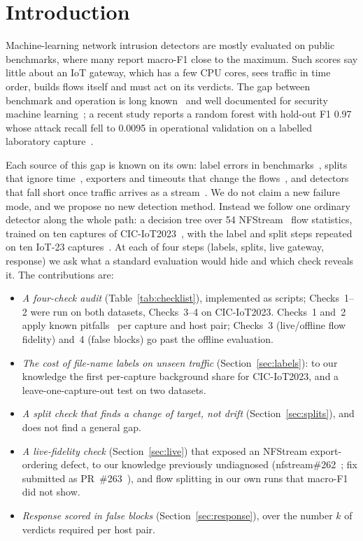 \section{Introduction}\label{sec:intro}

Machine-learning network intrusion detectors are mostly evaluated on public benchmarks, where many report macro-F1 close to the maximum. Such scores say little about an IoT gateway, which has a few CPU cores, sees traffic in time order, builds flows itself and must act on its verdicts. The gap between benchmark and operation is long known~\cite{sommer2010outside} and well documented for security machine learning~\cite{arp2022dos,apruzzese2023sok}; a recent study reports a random forest with hold-out F1 0.97 whose attack recall fell to 0.0095 in operational validation on a labelled laboratory capture~\cite{tang2026hybrid}.

Each source of this gap is known on its own: label errors in benchmarks~\cite{engelen2021troubleshooting,liu2022error,lanvin2023errors,flood2024smells}, splits that ignore time~\cite{pendlebury2019tesseract,arp2022dos,andresini2021insomnia}, exporters and timeouts that change the flows~\cite{velan2020impact,pinto2025flowexporter}, and detectors that fall short once traffic arrives as a stream~\cite{pekar2025early,zhao2026gidseval}. We do not claim a new failure mode, and we propose no new detection method. Instead we follow one ordinary detector along the whole path: a decision tree over 54 NFStream~\cite{aouini2022nfstream} flow statistics, trained on ten captures of CIC-IoT2023~\cite{neto2023ciciot2023}, with the label and split steps repeated on ten IoT-23 captures~\cite{garcia2020iot23}. At each of four steps (labels, splits, live gateway, response) we ask what a standard evaluation would hide and which check reveals it. The contributions are:
\begin{itemize}
\item \emph{A four-check audit} (Table~\ref{tab:checklist}), implemented as scripts; Checks~1--2 were run on both datasets, Checks~3--4 on CIC-IoT2023. Checks~1 and~2 apply known pitfalls~\cite{arp2022dos,flood2024smells} per capture and host pair; Checks~3 (live/offline flow fidelity) and~4 (false blocks) go past the offline evaluation.
\item \emph{The cost of file-name labels on unseen traffic} (Section~\ref{sec:labels}): to our knowledge the first per-capture background share for CIC-IoT2023, and a leave-one-capture-out test on two datasets.
\item \emph{A split check that finds a change of target, not drift} (Section~\ref{sec:splits}), and does not find a general gap.
\item \emph{A live-fidelity check} (Section~\ref{sec:live}) that exposed an NFStream export-ordering defect, to our knowledge previously undiagnosed (nfstream\#262~\cite{nfstream262}; fix submitted as PR~\#263~\cite{nfstream263}), and flow splitting in our own runs that macro-F1 did not show.
\item \emph{Response scored in false blocks} (Section~\ref{sec:response}), over the number $k$ of verdicts required per host pair.
\end{itemize}

